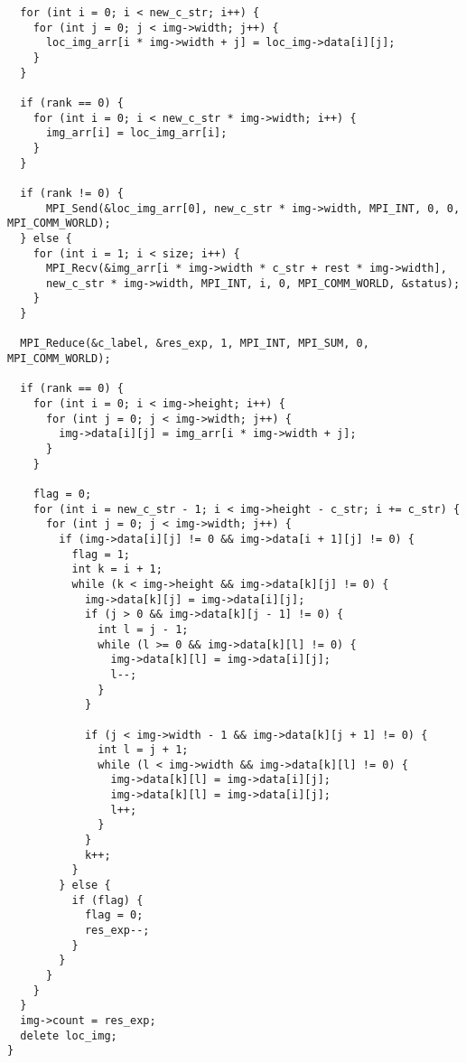 \documentclass{report}
\begin{document}
\begin{lstlisting}
  for (int i = 0; i < new_c_str; i++) {
    for (int j = 0; j < img->width; j++) {
      loc_img_arr[i * img->width + j] = loc_img->data[i][j];
    }
  }

  if (rank == 0) {
    for (int i = 0; i < new_c_str * img->width; i++) {
      img_arr[i] = loc_img_arr[i];
    }
  }

  if (rank != 0) {
      MPI_Send(&loc_img_arr[0], new_c_str * img->width, MPI_INT, 0, 0, MPI_COMM_WORLD);
  } else {
    for (int i = 1; i < size; i++) {
      MPI_Recv(&img_arr[i * img->width * c_str + rest * img->width],
      new_c_str * img->width, MPI_INT, i, 0, MPI_COMM_WORLD, &status);
    }
  }

  MPI_Reduce(&c_label, &res_exp, 1, MPI_INT, MPI_SUM, 0, MPI_COMM_WORLD);

  if (rank == 0) {
    for (int i = 0; i < img->height; i++) {
      for (int j = 0; j < img->width; j++) {
        img->data[i][j] = img_arr[i * img->width + j];
      }
    }

    flag = 0;
    for (int i = new_c_str - 1; i < img->height - c_str; i += c_str) {
      for (int j = 0; j < img->width; j++) {
        if (img->data[i][j] != 0 && img->data[i + 1][j] != 0) {
          flag = 1;
          int k = i + 1;
          while (k < img->height && img->data[k][j] != 0) {
            img->data[k][j] = img->data[i][j];
            if (j > 0 && img->data[k][j - 1] != 0) {
              int l = j - 1;
              while (l >= 0 && img->data[k][l] != 0) {
                img->data[k][l] = img->data[i][j];
                l--;
              }
            }

            if (j < img->width - 1 && img->data[k][j + 1] != 0) {
              int l = j + 1;
              while (l < img->width && img->data[k][l] != 0) {
                img->data[k][l] = img->data[i][j];
                img->data[k][l] = img->data[i][j];
                l++;
              }
            }
            k++;
          }
        } else {
          if (flag) {
            flag = 0;
            res_exp--;
          }
        }
      }
    }
  }
  img->count = res_exp;
  delete loc_img;
}

\end{lstlisting}
\end{document}
